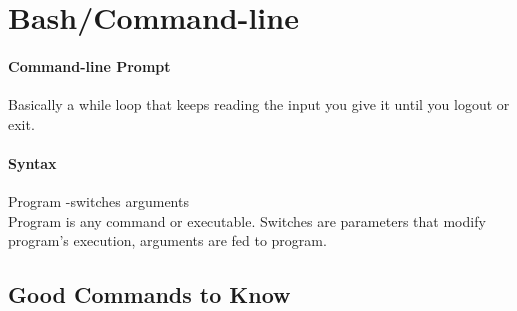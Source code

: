 \documentclass[12 pt]{article}
\begin{document}
	\section{Bash/Command-line} 
	\paragraph{Command-line Prompt}Basically a while loop that keeps reading the input you give it until you logout or exit.
	\paragraph{Syntax} Program -switches arguments
	\\ Program is any command or executable. Switches are parameters that modify program's execution, arguments are fed to program. 
	\subsection{Good Commands to Know}
\end{document}
